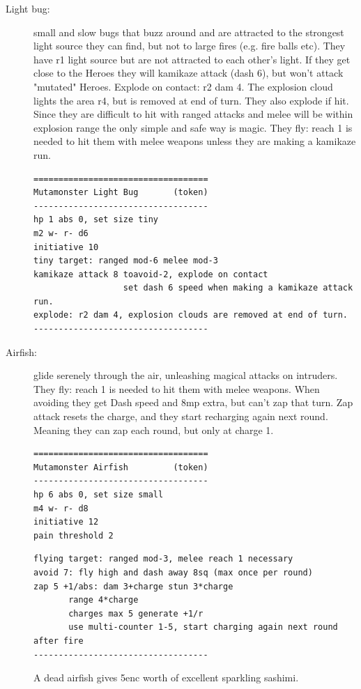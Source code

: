 \begin{description}

\item[Light bug:] small and slow bugs that buzz around and are attracted to the strongest light source they can find, but not to large fires (e.g. fire balls etc). They have r1 light source but are not attracted to each other's light. If they get close to the Heroes they will kamikaze attack (dash 6), but won't attack "mutated" Heroes. Explode on contact: r2 dam 4. The explosion cloud lights the area r4, but is removed at end of turn.
They also explode if hit. Since they are difficult to hit with ranged attacks and melee will be within explosion range the only simple and safe way is magic.
They fly: reach 1 is needed to hit them with melee weapons unless they are making a kamikaze run.
\goodbreak \small \begin{samepage} \begin{verbatim}
===================================
Mutamonster Light Bug       (token)
-----------------------------------
hp 1 abs 0, set size tiny
m2 w- r- d6
initiative 10
tiny target: ranged mod-6 melee mod-3
kamikaze attack 8 toavoid-2, explode on contact
                  set dash 6 speed when making a kamikaze attack run.
explode: r2 dam 4, explosion clouds are removed at end of turn.
-----------------------------------
\end{verbatim} \end{samepage} \normalsize


\item[Airfish:] glide serenely through the air, unleashing magical attacks on intruders. They fly: reach 1 is needed to hit them with melee weapons.
When avoiding they get Dash speed and 8mp extra, but can't zap that turn.
Zap attack resets the charge, and they start recharging again next round. Meaning they can zap each round, but only at charge 1.
\goodbreak \small \begin{samepage} \begin{verbatim}
===================================
Mutamonster Airfish         (token)
-----------------------------------
hp 6 abs 0, set size small
m4 w- r- d8
initiative 12
pain threshold 2
\end{verbatim} \goodbreak \begin{verbatim}
flying target: ranged mod-3, melee reach 1 necessary
avoid 7: fly high and dash away 8sq (max once per round)
zap 5 +1/abs: dam 3+charge stun 3*charge
       range 4*charge
       charges max 5 generate +1/r
       use multi-counter 1-5, start charging again next round after fire
-----------------------------------
\end{verbatim} \end{samepage} \normalsize 
A dead airfish gives 5enc worth of excellent sparkling sashimi.



\end{description}
